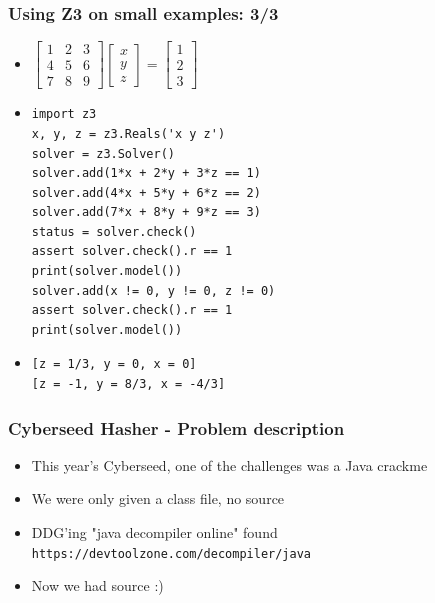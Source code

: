 \documentclass[aspectratio=169]{beamer}
\begin{document}
\begin{frame}[fragile]
\frametitle{Using Z3 on small examples: 3/3}
\begin{itemize}
\item 
\(
\left[\begin{matrix}
1 & 2 & 3\\
4 & 5 & 6\\
7 & 8 & 9
\end{matrix}\right] 
\left[\begin{matrix}
x\\y\\z
\end{matrix}\right] 
 = \left[\begin{matrix}
1\\2\\3
\end{matrix}\right]
\)
\item \begin{Verbatim}[fontsize=\scriptsize, frame=single]
import z3
x, y, z = z3.Reals('x y z')
solver = z3.Solver()
solver.add(1*x + 2*y + 3*z == 1)
solver.add(4*x + 5*y + 6*z == 2)
solver.add(7*x + 8*y + 9*z == 3)
status = solver.check()
assert solver.check().r == 1
print(solver.model())
solver.add(x != 0, y != 0, z != 0)
assert solver.check().r == 1
print(solver.model())
\end{Verbatim}
\item \begin{Verbatim}[fontsize=\scriptsize, frame=single]
[z = 1/3, y = 0, x = 0]
[z = -1, y = 8/3, x = -4/3]
\end{Verbatim}
\end{itemize}
\end{frame}

\begin{frame}[fragile]
\frametitle{Cyberseed Hasher - Problem description}
\begin{itemize}
\item This year's Cyberseed, one of the challenges was a Java crackme
\item We were only given a class file, no source
\item DDG'ing "java decompiler online" found \verb|https://devtoolzone.com/decompiler/java|
\item Now we had source :)
\end{itemize}
\end{frame}
\end{document}
